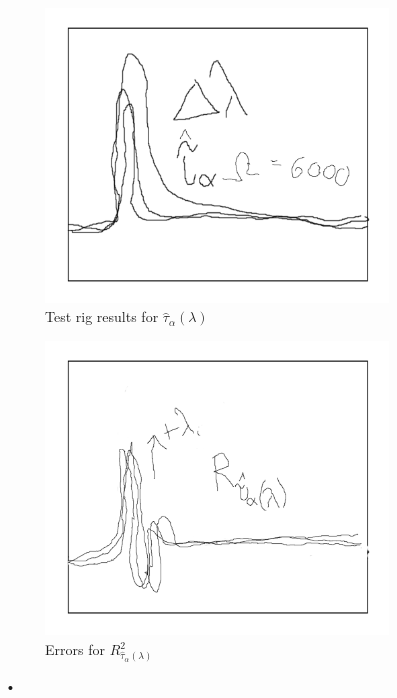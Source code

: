 \begin{figure}[htbp]
\centering
\begin{subfigure}{0.49\textwidth}
\centering
\includegraphics[width=\textwidth]{graphs/tau-alpha}
\caption{Test rig results for $\hat{\tau}_\alpha(\lambda)$}
\label{fig:tau-alpha}
\end{subfigure}
\begin{subfigure}{0.49\textwidth}
\centering
\includegraphics[width=\textwidth]{graphs/tau-alpha-r}
\caption{Errors for $R^2_{\hat{\tau}_\alpha(\lambda)}$}
\label{fig:tau-alpha-r}
\end{subfigure}
\caption{•}
\end{figure}
